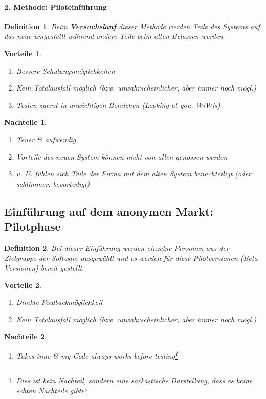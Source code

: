 \documentclass[a4paper]{article}
\theoremstyle{break}
\newtheorem{defi}{Definition}[section]
\newtheorem{why}{Vorteile}[section]
\newtheorem{whynot}{Nachteile}[section]
\begin{document}
\paragraph{2. Methode: Piloteinführung}
\begin{defi}
	Beim \textbf{Versuchslauf} dieser Methode werden Teile des Systems auf das neue umgestellt während andere Teile beim alten Belassen werden
\end{defi}
\begin{why}
	\begin{enumerate}
		\item Bessere Schulungsmöglichkeiten
		\item Kein Totalausfall möglich (bzw. unwahrscheinlicher, aber immer noch mögl.)
		\item Testen zuerst in unwichtigen Bereichen (Looking at you, WiWis)
	\end{enumerate}
\end{why}
\begin{whynot}
	\begin{enumerate}
		\item Teuer \& aufwendig
		\item Vorteile des neuen System können nicht von allen genossen werden
		\item u. U. fühlen sich Teile der Firma mit dem alten System benachteiligt (oder schlimmer: bevorteiligt)
	\end{enumerate}
\end{whynot}
\subsection{Einführung auf dem anonymen Markt: Pilotphase}
\begin{defi}
Bei dieser Einführung werden einzelne Personen aus der Zielgruppe der Software ausgewählt und es werden für diese Pilotversionen (Beta-Versionen) bereit gestellt.
\end{defi}
\begin{why}
	\begin{enumerate}
		\item Direkte Feedbackmöglichkeit
		\item Kein Totalausfall möglich (bzw. unwahrscheinlicher, aber immer noch mögl.)
	\end{enumerate}
\end{why}
\begin{whynot}
	\begin{enumerate}
		\item Takes time \& my Code always works before testing\footnote{Dies ist kein Nachteil, sondern eine sarkastische Darstellung, dass es keine echten Nachteile gibt}
	\end{enumerate}
\end{whynot}
\end{document}

